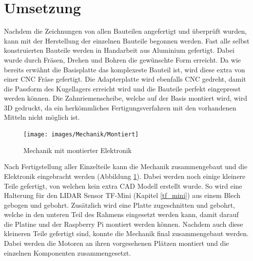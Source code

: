 \section{Umsetzung}
Nachdem die Zeichnungen von allen Bauteilen angefertigt und überprüft wurden, kann mit der Herstellung der einzelnen Bauteile begonnen werden. Fast alle selbst konstruierten Bauteile werden in Handarbeit aus Aluminium gefertigt. Dabei wurde durch Fräsen, Drehen und Bohren die gewünschte Form erreicht. Da wie bereits erwähnt die Basisplatte das komplexeste Bauteil ist, wird diese extra von einer \ac{CNC} Fräse gefertigt. Die Adapterplatte wird ebenfalls  \ac{CNC} gedreht, damit die Passform des Kugellagers erreicht wird und die Bauteile perfekt eingepresst werden können. Die Zahnriemenscheibe, welche auf der Basis montiert wird, wird \ac{3D} gedruckt, da ein herkömmliches Fertigungsverfahren mit den vorhandenen Mitteln nicht möglich ist.\\
\begin{figure}[H]
	\centering
	\texttt{[image: images/Mechanik/Montiert]}
	\caption{Mechanik mit montierter Elektronik}
	\label{montiert}
\end{figure}
Nach Fertigstellung aller Einzelteile kann die Mechanik zusammengebaut und die Elektronik eingebracht werden (Abbildung \ref{montiert}). Dabei werden noch einige kleinere Teile gefertigt, von welchen kein extra \ac{CAD} Modell erstellt wurde. So wird eine Halterung für den \ac{LIDAR} Sensor TF-Mini (Kapitel \ref{tf_mini}) aus einem Blech gebogen und gebohrt. Zusätzlich wird eine Platte zugeschnitten und gebohrt, welche in den unteren Teil des Rahmens eingesetzt werden kann, damit darauf die Platine und der Raspberry Pi montiert werden können. Nachdem auch diese kleineren Teile gefertigt sind, konnte die Mechanik final zusammengebaut werden. Dabei werden die Motoren an ihren vorgesehenen Plätzen montiert und die einzelnen Komponenten zusammengesetzt.
